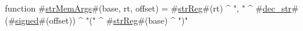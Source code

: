function #\hyperref[sailMIPSzstrMemArgs]{strMemArgs}#(base, rt, offset) = #\hyperref[sailMIPSzstrReg]{strReg}#(rt) ^ ", " ^ #\hyperref[sailMIPSzdeczystr]{dec\_str}#(#\hyperref[sailMIPSzsigned]{signed}#(offset)) ^ "(" ^ #\hyperref[sailMIPSzstrReg]{strReg}#(base) ^ ")"
